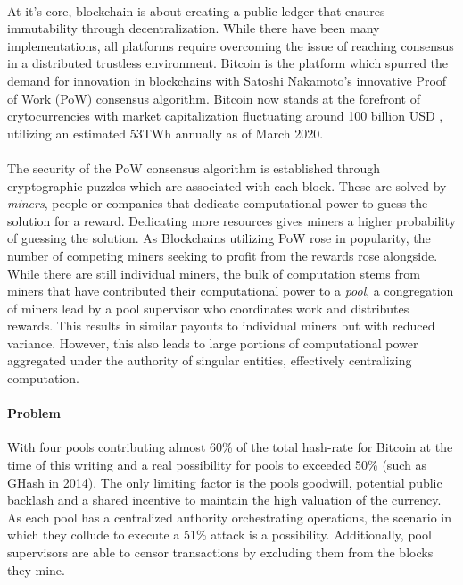 \paragraph{} At it's core, blockchain is about creating a public ledger that ensures immutability through decentralization. While there have been many implementations, all platforms require overcoming the issue of reaching consensus in a distributed trustless environment. Bitcoin \cite{nakamoto2009} is the platform which spurred the demand for innovation in blockchains with Satoshi Nakamoto's innovative Proof of Work (PoW) consensus algorithm. Bitcoin now stands at the forefront of crytocurrencies with market capitalization fluctuating around 100 billion USD \cite{bitcoinmarketcap2020}, utilizing an estimated 53TWh annually \cite{cambridge2020} as of March 2020.

\paragraph{} The security of the PoW consensus algorithm is established through cryptographic puzzles which are associated with each block. These are solved by \textit{miners}, people or companies that dedicate computational power to guess the solution for a reward. Dedicating more resources gives miners a higher probability of guessing the solution. As Blockchains utilizing PoW rose in popularity, the number of competing miners seeking to profit from the rewards rose alongside. While there are still individual miners, the bulk of computation stems from miners that have contributed their computational power to a \textit{pool}, a congregation of miners lead by a pool supervisor who coordinates work and distributes rewards. This results in similar payouts to individual miners but with reduced variance. However, this also leads to large portions of computational power aggregated under the authority of singular entities, effectively centralizing computation.

\paragraph{Problem} With four pools contributing almost 60\% of the total hash-rate for Bitcoin \cite{bitcoinpools2020} at the time of this writing and a real possibility for pools to exceeded 50\% (such as GHash \cite{ghash2019} in 2014). The only limiting factor is the pools goodwill, potential public backlash and a shared incentive to maintain the high valuation of the currency. As each pool has a centralized authority orchestrating operations, the scenario in which they collude to execute a 51\% attack is a possibility. Additionally, pool supervisors are able to censor transactions by excluding them from the blocks they mine. 

